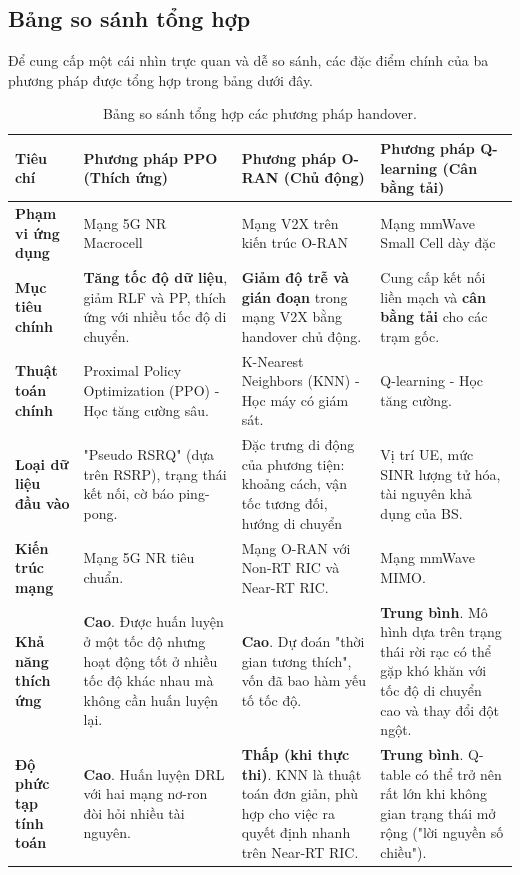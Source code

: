 \documentclass{article} %
\begin{document}
\subsection{Bảng so sánh tổng hợp}
Để cung cấp một cái nhìn trực quan và dễ so sánh, các đặc điểm chính của ba phương pháp được tổng hợp trong bảng dưới đây.
\begin{table}[h!]
\centering
\caption{Bảng so sánh tổng hợp các phương pháp handover.}
\label{tab:comparison}
\begin{tabular}{|>{\raggedright\arraybackslash}p{2.5cm}|>{\raggedright\arraybackslash}p{3.5cm}|>{\raggedright\arraybackslash}p{3.5cm}|>{\raggedright\arraybackslash}p{3.5cm}|}
\hline
\textbf{Tiêu chí} & \textbf{Phương pháp PPO (Thích ứng)} & \textbf{Phương pháp O-RAN (Chủ động)} & \textbf{Phương pháp Q-learning (Cân bằng tải)} \\
\hline
\textbf{Phạm vi ứng dụng} & Mạng 5G NR Macrocell & Mạng V2X trên kiến trúc O-RAN & Mạng mmWave Small Cell dày đặc \\
\hline
\textbf{Mục tiêu chính} & \textbf{Tăng tốc độ dữ liệu}, giảm RLF và PP, thích ứng với nhiều tốc độ di chuyển. & \textbf{Giảm độ trễ và gián đoạn} trong mạng V2X bằng handover chủ động. & Cung cấp kết nối liền mạch và \textbf{cân bằng tải} cho các trạm gốc. \\
\hline
\textbf{Thuật toán chính} & Proximal Policy Optimization (PPO) - Học tăng cường sâu. & K-Nearest Neighbors (KNN) - Học máy có giám sát. & Q-learning - Học tăng cường. \\
\hline
\textbf{Loại dữ liệu đầu vào} & "Pseudo RSRQ" (dựa trên RSRP), trạng thái kết nối, cờ báo ping-pong. & Đặc trưng di động của phương tiện: khoảng cách, vận tốc tương đối, hướng di chuyển & Vị trí UE, mức SINR lượng tử hóa, tài nguyên khả dụng của BS. \\
\hline
\textbf{Kiến trúc mạng} & Mạng 5G NR tiêu chuẩn. & Mạng O-RAN với Non-RT RIC và Near-RT RIC. & Mạng mmWave MIMO. \\
\hline
\textbf{Khả năng thích ứng} & \textbf{Cao}. Được huấn luyện ở một tốc độ nhưng hoạt động tốt ở nhiều tốc độ khác nhau mà không cần huấn luyện lại. & \textbf{Cao}. Dự đoán "thời gian tương thích", vốn đã bao hàm yếu tố tốc độ. & \textbf{Trung bình}. Mô hình dựa trên trạng thái rời rạc có thể gặp khó khăn với tốc độ di chuyển cao và thay đổi đột ngột. \\
\hline
\textbf{Độ phức tạp tính toán} & \textbf{Cao}. Huấn luyện DRL với hai mạng nơ-ron đòi hỏi nhiều tài nguyên. & \textbf{Thấp (khi thực thi)}. KNN là thuật toán đơn giản, phù hợp cho việc ra quyết định nhanh trên Near-RT RIC. & \textbf{Trung bình}. Q-table có thể trở nên rất lớn khi không gian trạng thái mở rộng ("lời nguyền số chiều"). \\
\hline
\end{tabular}
\end{table}
\newpage
\end{document}
